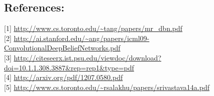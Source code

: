 \documentclass{article}
\begin{document}
\subsection{References:}
{[1]} \url{http://www.cs.toronto.edu/~tang/papers/mr_dbn.pdf} \\
{[2]} \url{http://ai.stanford.edu/~ang/papers/icml09-ConvolutionalDeepBeliefNetworks.pdf} \\
{[3]} \url{http://citeseerx.ist.psu.edu/viewdoc/download?doi=10.1.1.308.3887&rep=rep1&type=pdf} \\ 
{[4]} \url{http://arxiv.org/pdf/1207.0580.pdf} \\
{[5]} \url{http://www.cs.toronto.edu/~rsalakhu/papers/srivastava14a.pdf}
\end{document}
